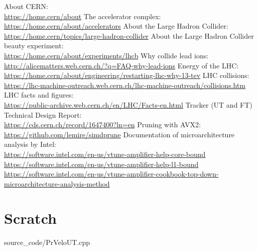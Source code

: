 \documentclass[12pt]{article}
\begin{document}
\begin{thebibliography}{asd}
	 About CERN: \\
		\url{https://home.cern/about}
	 The accelerator complex: \\
		\url{https://home.cern/about/accelerators}
	 About the Large Hadron Collider: \\
		\url{https://home.cern/topics/large-hadron-collider}
	 About the Large Hadron Collider beauty experiment: \\
		\url{https://home.cern/about/experiments/lhcb}
	 Why collide lead ions: \\
		\url{http://alicematters.web.cern.ch/?q=FAQ-why-lead-ions}
	 Energy of the LHC: \\
		\url{https://home.cern/about/engineering/restarting-lhc-why-13-tev}
	 LHC collisions: \\
		\url{https://lhc-machine-outreach.web.cern.ch/lhc-machine-outreach/collisions.htm}
	 LHC facts and figures: \\
		\url{https://public-archive.web.cern.ch/en/LHC/Facts-en.html}
	 Tracker (UT and FT) Technical Design Report: \\
		\url{https://cds.cern.ch/record/1647400?ln=en}
	 Pruning with AVX2: \\
		\url{https://github.com/lemire/simdprune} 
	 Documentation of microarchitecture analysis by Intel: \\
		\url{https://software.intel.com/en-us/vtune-amplifier-help-core-bound}\\
		\url{https://software.intel.com/en-us/vtune-amplifier-help-l1-bound}\\
		\url{https://software.intel.com/en-us/vtune-amplifier-cookbook-top-down-microarchitecture-analysis-method}
\end{thebibliography}


\newpage
\section{Scratch}


	{source_code/PrVeloUT.cpp}
\end{document}
